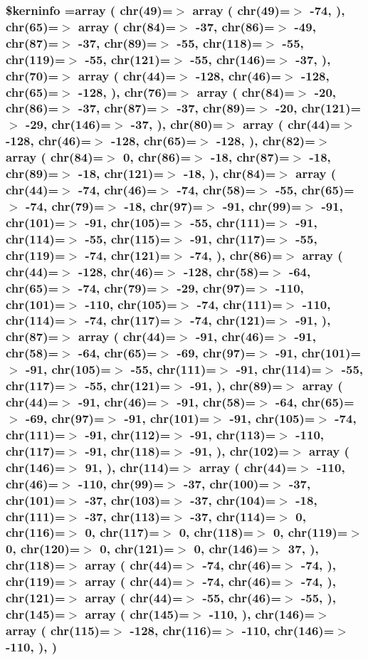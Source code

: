 \hypertarget{ctimesi_8php_ab4bb7d3b0332c517f6a42a1924f01000}{
\subsubsection[{\$kerninfo}]{\setlength{\rightskip}{0pt plus 5cm}\$kerninfo =array ( chr(49)=$>$ array ( chr(49)=$>$ -\/74, ), chr(65)=$>$ array ( chr(84)=$>$ -\/37, chr(86)=$>$ -\/49, chr(87)=$>$ -\/37, chr(89)=$>$ -\/55, chr(118)=$>$ -\/55, chr(119)=$>$ -\/55, chr(121)=$>$ -\/55, chr(146)=$>$ -\/37, ), chr(70)=$>$ array ( chr(44)=$>$ -\/128, chr(46)=$>$ -\/128, chr(65)=$>$ -\/128, ), chr(76)=$>$ array ( chr(84)=$>$ -\/20, chr(86)=$>$ -\/37, chr(87)=$>$ -\/37, chr(89)=$>$ -\/20, chr(121)=$>$ -\/29, chr(146)=$>$ -\/37, ), chr(80)=$>$ array ( chr(44)=$>$ -\/128, chr(46)=$>$ -\/128, chr(65)=$>$ -\/128, ), chr(82)=$>$ array ( chr(84)=$>$ 0, chr(86)=$>$ -\/18, chr(87)=$>$ -\/18, chr(89)=$>$ -\/18, chr(121)=$>$ -\/18, ), chr(84)=$>$ array ( chr(44)=$>$ -\/74, chr(46)=$>$ -\/74, chr(58)=$>$ -\/55, chr(65)=$>$ -\/74, chr(79)=$>$ -\/18, chr(97)=$>$ -\/91, chr(99)=$>$ -\/91, chr(101)=$>$ -\/91, chr(105)=$>$ -\/55, chr(111)=$>$ -\/91, chr(114)=$>$ -\/55, chr(115)=$>$ -\/91, chr(117)=$>$ -\/55, chr(119)=$>$ -\/74, chr(121)=$>$ -\/74, ), chr(86)=$>$ array ( chr(44)=$>$ -\/128, chr(46)=$>$ -\/128, chr(58)=$>$ -\/64, chr(65)=$>$ -\/74, chr(79)=$>$ -\/29, chr(97)=$>$ -\/110, chr(101)=$>$ -\/110, chr(105)=$>$ -\/74, chr(111)=$>$ -\/110, chr(114)=$>$ -\/74, chr(117)=$>$ -\/74, chr(121)=$>$ -\/91, ), chr(87)=$>$ array ( chr(44)=$>$ -\/91, chr(46)=$>$ -\/91, chr(58)=$>$ -\/64, chr(65)=$>$ -\/69, chr(97)=$>$ -\/91, chr(101)=$>$ -\/91, chr(105)=$>$ -\/55, chr(111)=$>$ -\/91, chr(114)=$>$ -\/55, chr(117)=$>$ -\/55, chr(121)=$>$ -\/91, ), chr(89)=$>$ array ( chr(44)=$>$ -\/91, chr(46)=$>$ -\/91, chr(58)=$>$ -\/64, chr(65)=$>$ -\/69, chr(97)=$>$ -\/91, chr(101)=$>$ -\/91, chr(105)=$>$ -\/74, chr(111)=$>$ -\/91, chr(112)=$>$ -\/91, chr(113)=$>$ -\/110, chr(117)=$>$ -\/91, chr(118)=$>$ -\/91, ), chr(102)=$>$ array ( chr(146)=$>$ 91, ), chr(114)=$>$ array ( chr(44)=$>$ -\/110, chr(46)=$>$ -\/110, chr(99)=$>$ -\/37, chr(100)=$>$ -\/37, chr(101)=$>$ -\/37, chr(103)=$>$ -\/37, chr(104)=$>$ -\/18, chr(111)=$>$ -\/37, chr(113)=$>$ -\/37, chr(114)=$>$ 0, chr(116)=$>$ 0, chr(117)=$>$ 0, chr(118)=$>$ 0, chr(119)=$>$ 0, chr(120)=$>$ 0, chr(121)=$>$ 0, chr(146)=$>$ 37, ), chr(118)=$>$ array ( chr(44)=$>$ -\/74, chr(46)=$>$ -\/74, ), chr(119)=$>$ array ( chr(44)=$>$ -\/74, chr(46)=$>$ -\/74, ), chr(121)=$>$ array ( chr(44)=$>$ -\/55, chr(46)=$>$ -\/55, ), chr(145)=$>$ array ( chr(145)=$>$ -\/110, ), chr(146)=$>$ array ( chr(115)=$>$ -\/128, chr(116)=$>$ -\/110, chr(146)=$>$ -\/110, ), )}}\label{ctimesi_8php_ab4bb7d3b0332c517f6a42a1924f01000}


